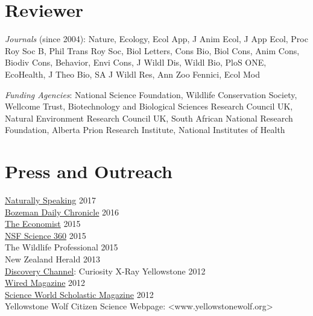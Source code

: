\documentclass[12pt,]{article}
\begin{document}
\hypertarget{reviewer}{%
\section{Reviewer}\label{reviewer}}

\emph{Journals} (since 2004): Nature, Ecology, Ecol App, J Anim Ecol, J
App Ecol, Proc Roy Soc B, Phil Trans Roy Soc, Biol Letters, Cons Bio,
Biol Cons, Anim Cons, Biodiv Cons, Behavior, Envi Cons, J Wildl Dis,
Wildl Bio, PloS ONE, EcoHealth, J Theo Bio, SA J Wildl Res, Ann Zoo
Fennici, Ecol Mod

\emph{Funding Agencies}: National Science Foundation, Wildlife
Conservation Society, Wellcome Trust, Biotechnology and Biological
Sciences Research Council UK, Natural Environment Research Council UK,
South African National Research Foundation, Alberta Prion Research
Institute, National Institutes of Health

\hypertarget{press-and-outreach}{%
\section{Press and Outreach}\label{press-and-outreach}}

\href{https://naturallyspeaking.blog/2017/04/26/episode-51-natures-greatest-theatre-ecology-and-disease-in-yellowstone/}{Naturally
Speaking} 2017\\
\href{http://www.bozemandailychronicle.com/news/environment/report-elk-greater-brucellosis-transmission-risk-than-bison/article_8329c551-18a2-50a5-9352-f585935a7d99.html}{Bozeman
Daily Chronicle} 2016\\
\href{http://www.economist.com/news/science-and-technology/21652259-wolves-yellowstone-provide-some-surprising-survival-lessons-pack-power}{The
Economist} 2015\\
\href{https://science360.gov/obj/video/0f50aca7-2691-4126-996f-8ec5b74a9eb0/understanding-ecological-role-wolves-yellowstone-national-park}{NSF
Science 360} 2015\\
The Wildlife Professional 2015\\
New Zealand Herald 2013\\
\href{http://store.discoveryeducation.com/product/show/129481}{Discovery
Channel}: Curiosity X-Ray Yellowstone 2012\\
\href{https://www.wired.com/2012/05/st_photo_wolves/}{Wired Magazine}
2012\\
\href{http://scienceworld.scholastic.com/issues/09_17_12}{Science World
Scholastic Magazine} 2012\\
Yellowstone Wolf Citizen Science Webpage:
\textless{}www.yellowstonewolf.org\textgreater{}
\end{document}
